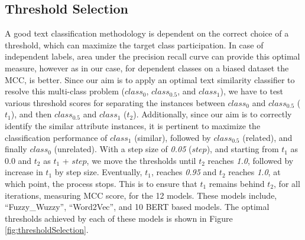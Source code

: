 \documentclass{ieeeaccess}
\begin{document}
\subsection{Threshold Selection}
A good text classification methodology is dependent on the correct choice of a threshold, which can maximize the target class participation. In case of independent labels, area under the precision recall curve can provide this optimal measure, however as in our case, for dependent classes on a biased dataset the MCC, is better\cite{chicco2020advantages}.
Since our aim is to apply an optimal text similarity classifier to resolve this multi-class problem ($class_0$, $class_{0.5}$, and $class_1$), we have to test various threshold scores for separating the instances between $class_0$ and $class_{0.5}$ ($t_1$), and then $class_{0.5}$ and $class_1$ ($t_2$). Additionally, since our aim is to correctly identify the similar attribute instances, it is pertinent to maximize the classification performance of $class_1$ (similar), followed by $class_{0.5}$ (related), and finally $class_0$ (unrelated).
With a step size of \textit{0.05} ($step$), and starting from $t_1$ as 0.0 and $t_2$ as $t_1$ + $step$, we move the thresholds until $t_2$ reaches \textit{1.0}, followed by increase in $t_1$ by step size. Eventually, $t_1$, reaches \textit{0.95} and $t_2$ reaches \textit{1.0}, at which point, the process stops. This is to ensure that $t_1$ remains behind $t_2$, for all iterations, measuring MCC score, for the 12 models. These models include, ``Fuzzy\_Wuzzy'', ``Word2Vec'', and 10 BERT based models. The optimal thresholds achieved by each of these models is shown in Figure \ref{fig:thresholdSelection}.
\end{document}
